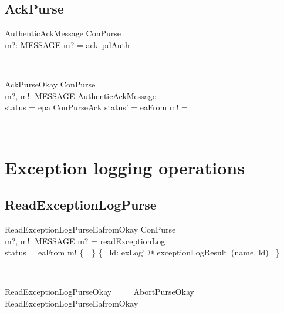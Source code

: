\subsection{AckPurse}

\begin{LSDef}
\begin{schema}{AuthenticAckMessage}
   ConPurse \\
   m?: MESSAGE
\where
   m? = ack~pdAuth
\end{schema}~\end{LSDef}

\begin{LSDef}
\begin{schema}{AckPurseOkay}
   \Delta ConPurse \\
   m?, m!: MESSAGE
\where
   AuthenticAckMessage \\
   status = epa
   \also
   \Xi ConPurseAck
   \also
   status' = eaFrom
   \also
   m! = \bot
\end{schema}~\end{LSDef}

\section{Exception logging operations}\label{ch4.exlog}

\subsection{ReadExceptionLogPurse}

\begin{LSDef}
\begin{schema}{ReadExceptionLogPurseEafromOkay}
   \Xi ConPurse \\
   m?, m!: MESSAGE
\where
   m? = readExceptionLog \\
   status = eaFrom
   \also
   m! \in \{~\bot~\} \cup \{~ ld: exLog' @ exceptionLogResult~(name, ld) ~\}
\end{schema}~\end{LSDef}

\begin{LSDef}
\begin{zed}
   ReadExceptionLogPurseOkay ~~~~ AbortPurseOkay \semi ReadExceptionLogPurseEafromOkay
\end{zed}~\end{LSDef}

